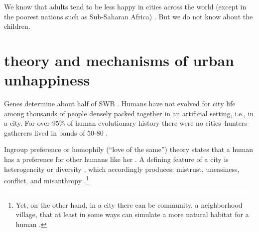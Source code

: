 \documentclass[10pt, letterpaper]{article}
\newcommand{\emd}[1]{\ExecuteMetaData[/tmp/tex]{#1}} %
\begin{document}
\begin{spacing}{1.4} %





We know that adults tend to be less happy in cities across the world (except in
the poorest nations such as Sub-Saharan Africa) \citep{aok21}. But we do not
know about the children. 

\section{theory and mechanisms of urban unhappiness}

 Genes determine about half of SWB
 \citep{schnittker08,lykken96t,brooksGenetic}.
 Humans have not
evolved for city life among thousands of people densely packed together in an
artificial setting, i.e., in a city. For over 95\% of human evolutionary history there were no cities--hunters-gatherers lived in bands of 50-80 \citep{maryanski92}. 


Ingroup preference or homophily (``love of the same'') theory
  states
that a  human has a preference for other humans like her \citep{mcpherson01,tajfel82,tajfel71,smelser99,putnam07,christakis09f}. %
 A defining
feature of a city is heterogeneity or diversity \citep{wirth38}, which
accordingly produces: 
 mistrust, uneasiness, conflict, and misanthropy
 \citep{milgram70,thrift05,amin06}.\footnote{
 Yet, on the other hand, in a city there can be community, a neighborhood
village, that at least in some ways can simulate a more natural habitat for a
human \citep{fischer95,fischer75,jacobs93}.}


\end{spacing}
\end{document}
